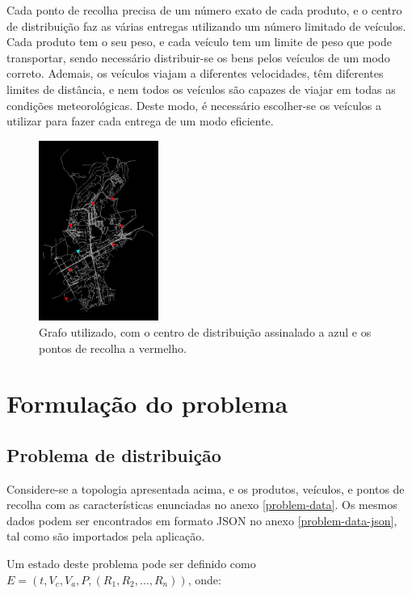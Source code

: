 \documentclass[12pt, a4paper, titlepage]{article}
\begin{document}
Cada ponto de recolha precisa de um número exato de cada produto, e o centro de distribuição faz as
várias entregas utilizando um número limitado de veículos. Cada produto tem o seu peso, e cada
veículo tem um limite de peso que pode transportar, sendo necessário distribuir-se os bens pelos
veículos de um modo correto. Ademais, os veículos viajam a diferentes velocidades, têm diferentes
limites de distância, e nem todos os veículos são capazes de viajar em todas as condições
meteorológicas. Deste modo, é necessário escolher-se os veículos a utilizar para fazer cada entrega
de um modo eficiente.

\begin{figure}[H]
    \centering
    \includegraphics[width=0.35\textwidth]{res/PontosImportantes.png}
    \caption{
        Grafo utilizado, com o centro de distribuição assinalado a azul e os pontos de recolha a
        vermelho.
    }
\end{figure}

\section{Formulação do problema}

\subsection{Problema de distribuição}

Considere-se a topologia apresentada acima, e os produtos, veículos, e pontos de recolha com as
características enunciadas no anexo \ref{problem-data}. Os mesmos dados podem ser encontrados em
formato JSON no anexo \ref{problem-data-json}, tal como são importados pela aplicação.

Um estado deste problema pode ser definido como $E = (t, V_c, V_a, P, (R_1, R_2, \ldots, R_n))$,
onde:
\end{document}
